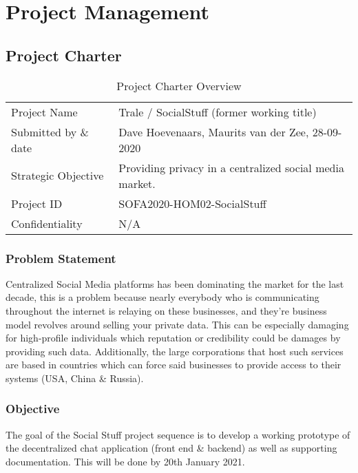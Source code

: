 
\chapter{Project Management}\label{ch:project-management}

\section{Project Charter}\label{sec:project-charter}

\begin{table}[]
    \begin{tabular}{ll}
        Project Name & Trale / SocialStuff (former working title) \\
        Submitted by \& date & Dave Hoevenaars, Maurits van der Zee, 28-09-2020 \\
        Strategic Objective & Providing privacy in a centralized social media market. \\
        Project ID & SOFA2020-HOM02-SocialStuff \\
        Confidentiality & N/A
    \end{tabular}
    \caption{Project Charter Overview}
    \label{tab:my-table}
\end{table}

\subsection{Problem Statement}\label{subsec:problem-statement}

Centralized Social Media platforms has been dominating the market for the last decade, this is a problem because nearly
everybody who is communicating throughout the internet is relaying on these businesses, and they’re business model
revolves around selling your private data.
This can be especially damaging for high-profile individuals which reputation or credibility could be damages by
providing such data.
Additionally, the large corporations that host such services are based in countries which can force said businesses to
provide access to their systems (USA, China \& Russia).

\subsection{Objective}\label{subsec:objective}

The goal of the Social Stuff project sequence is to develop a working prototype of the decentralized chat application
(front end \& backend) as well as supporting documentation.
This will be done by 20th January 2021.

